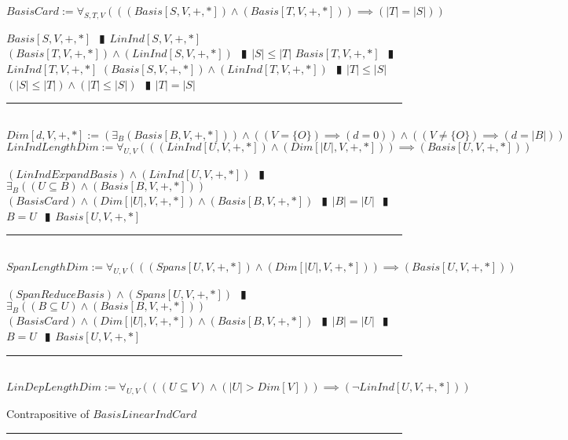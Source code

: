 \documentclass{book}
\newcommand{\abr}{:=}
\newcommand{\pipe}{$\phantom{(}\vrectangleblack\phantom{)}$}
\newcommand{\pr}[1]{\left(#1\right)}
\begin{document}
$BasisCard \abr \forall_{S, T, V}\pr{\pr{(Basis[S, V, +, *]) \land (Basis[T, V, +, *])} \implies (|T| = |S|)}$
\begin{enumerate}
  \lit $Basis[S, V, +, *]$ \pipe $LinInd[S, V, +, *]$
  \lit $(Basis[T, V, +, *]) \land (LinInd[S, V, +, *])$ \pipe $|S| \leq |T|$
  \lit $Basis[T, V, +, *]$ \pipe $LinInd[T, V, +, *]$
  \lit $(Basis[S, V, +, *]) \land (LinInd[T, V, +, *])$ \pipe $|T| \leq |S|$
  \lit $(|S| \leq |T|) \land (|T| \leq |S|)$ \pipe $|T| = |S|$
\end{enumerate} \vspace{.75mm} \hrule \vspace{.75mm} \ \\ 

$Dim[d, V, +, *] \abr \pr{\exists_{B}(Basis[B, V, +, *])} \land \pr{(V = \{O\}) \implies (d = 0)} \land  \pr{(V \neq \{O\}) \implies (d = |B|)}$ \\

$LinIndLengthDim \abr \forall_{U, V}\pr{\pr{(LinInd[U, V, +, *]) \land (Dim[|U|, V, +, *])} \implies (Basis[U, V, +, *])}$
\begin{enumerate}
  \lit $(LinIndExpandBasis) \land (LinInd[U, V, +, *])$ \pipe $\exists_{B}\pr{(U \subseteq B) \land (Basis[B, V, +, *])}$
  \lit $(BasisCard) \land (Dim[|U|, V, +, *]) \land (Basis[B, V, +, *])$ \pipe $|B| = |U|$ \pipe $B = U$ \pipe $Basis[U, V, +, *]$
\end{enumerate} \vspace{.75mm} \hrule \vspace{.75mm} \ \\ 

$SpanLengthDim \abr \forall_{U, V}\pr{\pr{(Spans[U, V, +, *]) \land (Dim[|U|, V, +, *])} \implies (Basis[U, V, +, *])}$
\begin{enumerate}
  \lit $(SpanReduceBasis) \land (Spans[U, V, +, *])$ \pipe $\exists_{B}\pr{(B \subseteq U) \land (Basis[B, V, +, *])}$
  \lit $(BasisCard) \land (Dim[|U|, V, +, *]) \land (Basis[B, V, +, *])$ \pipe $|B| = |U|$ \pipe $B = U$ \pipe $Basis[U, V, +, *]$
\end{enumerate} \vspace{.75mm} \hrule \vspace{.75mm} \ \\ 

$LinDepLengthDim \abr \forall_{U, V}\pr{\pr{(U \subseteq V) \land (|U| > Dim[V])} \implies (\lnot LinInd[U, V, +, *])}$
\begin{enumerate}
  \lit Contrapositive of $BasisLinearIndCard$
\end{enumerate} \vspace{.75mm} \hrule \vspace{.75mm} \ \\ 
\end{document}
